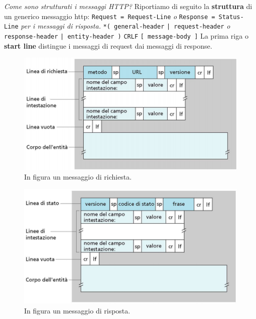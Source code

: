 \documentclass[11pt,a4paper]{article}
\theoremstyle{definition}
\begin{document}
\textit{Come sono strutturati i messaggi HTTP?}\newline\newline
Riportiamo di seguito la \textbf{struttura} di un generico messaggio http:\newline
\texttt{Request = Request-Line} \textit{o} \texttt{Response = Status-Line} \textit{per i messaggi di risposta.}\newline
\texttt{*( general-header}\newline
\texttt{| request-header} \textit{o} \texttt{response-header}\newline
\texttt{| entity-header )}\newline
\texttt{CRLF}\newline
\texttt{[ message-body ]}\newline
La prima riga o \textbf{start line} distingue i messaggi di request dai messaggi di response.
\begin{figure}[!h]
	\includegraphics[scale=0.25]{Immagini/Http_req.png}
	\centering
	\caption{In figura un messaggio di richiesta.}
\end{figure}
\begin{figure}[!h]
	\includegraphics[scale=0.25]{Immagini/Http_res.png}
	\centering
	\caption{In figura un messaggio di risposta.}
\end{figure}
\newpage
\end{document}
